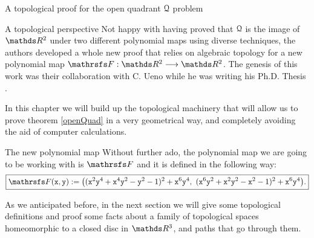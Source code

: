 \documentclass[11pt, a4paper, english, twoside, notitlepage, openright]{report}
\begin{document}
\begin{chapter}{A topological proof for the open quadrant $\mathcal{Q}$ problem}
\begin{section}{A topological perspective}
Not happy with having proved that $\mathcal{Q}$ is the image of $\R^2$ under two different polynomial maps using diverse techniques, the authors developed a whole new proof that relies on algebraic topology for a new polynomial map $\FFF: \R^2 \longrightarrow \R^2$. The genesis of this work was their collaboration with C. Ueno while he was writing his Ph.D. Thesis \cite{u}.

In this chapter we will build up the topological machinery that will allow us to prove theorem \ref{openQuad} in a very geometrical way, and completely avoiding the aid of computer calculations.
\begin{subsection}{The new polynomial map}
Without further ado, the polynomial map we are going to be working with is $\FFF$ and it is defined in the following way:
\begin{equation*}
\boxed{
\FFF({\tt x}, {\tt y}) := \big(({\tt x}^2{\tt y}^4+{\tt x}^4{\tt y}^2-{\tt y}^2-1)^2+{\tt x}^6{\tt y}^4,\ ({\tt x}^6{\tt y}^2+{\tt x}^2{\tt y}^2-{\tt x}^2-1)^2+{\tt x}^6{\tt y}^4\big).
}
\end{equation*}

As we anticipated before, in the next section we will give some topological definitions and proof some facts about a family of topological spaces homeomorphic to a closed disc in $\R^3$, and paths that go through them.


\end{subsection}
\end{section}
\end{chapter}
\end{document}
